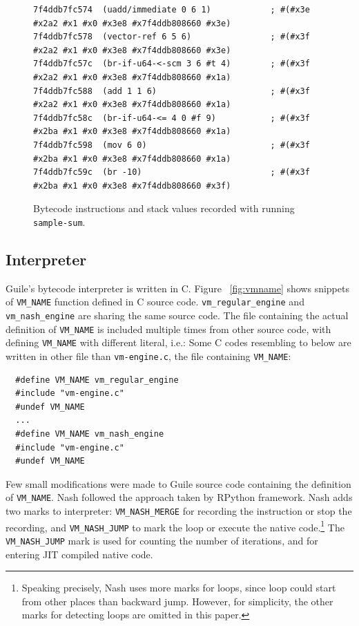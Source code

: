 \documentclass[preprint, numbers]{sigplanconf}
\begin{document}
\begin{figure}
  \centering
\begin{verbatim}
7f4ddb7fc574  (uadd/immediate 0 6 1)            ; #(#x3e #x2a2 #x1 #x0 #x3e8 #x7f4ddb808660 #x3e)
7f4ddb7fc578  (vector-ref 6 5 6)                ; #(#x3f #x2a2 #x1 #x0 #x3e8 #x7f4ddb808660 #x3e)
7f4ddb7fc57c  (br-if-u64-<-scm 3 6 #t 4)        ; #(#x3f #x2a2 #x1 #x0 #x3e8 #x7f4ddb808660 #x1a)
7f4ddb7fc588  (add 1 1 6)                       ; #(#x3f #x2a2 #x1 #x0 #x3e8 #x7f4ddb808660 #x1a)
7f4ddb7fc58c  (br-if-u64-<= 4 0 #f 9)           ; #(#x3f #x2ba #x1 #x0 #x3e8 #x7f4ddb808660 #x1a)
7f4ddb7fc598  (mov 6 0)                         ; #(#x3f #x2ba #x1 #x0 #x3e8 #x7f4ddb808660 #x1a)
7f4ddb7fc59c  (br -10)                          ; #(#x3f #x2ba #x1 #x0 #x3e8 #x7f4ddb808660 #x3f)
\end{verbatim}
\caption{Bytecode instructions and stack values recorded with running
  \texttt{sample-sum}.}
\label{fig:trace}
\end{figure}

\subsection{Interpreter}
Guile's bytecode interpreter is written in C. Figure~
\hyperref[fig:vmname]{\ref{fig:vmname}} shows snippets of \texttt{VM\_NAME}
function defined in C source code. \texttt{vm\_regular\_engine} and
\texttt{vm\_nash\_engine} are sharing the same source code. The file
containing the actual definition of \texttt{VM\_NAME} is included multiple
times from other source code, with defining \texttt{VM\_NAME} with different
literal, i.e.: Some C codes resembling to below are written in other file than
\texttt{vm-engine.c}, the file containing \texttt{VM\_NAME}:

\begin{verbatim}
  #define VM_NAME vm_regular_engine
  #include "vm-engine.c"
  #undef VM_NAME
  ...
  #define VM_NAME vm_nash_engine
  #include "vm-engine.c"
  #undef VM_NAME
\end{verbatim}

Few small modifications were made to Guile source code containing the
definition of \texttt{VM\_NAME}.  Nash followed the approach taken by
RPython\cite{bolz2009tracing} framework.  Nash adds two marks to interpreter:
\texttt{VM\_NASH\_MERGE} for recording the instruction or stop the recording,
and \texttt{VM\_NASH\_JUMP} to mark the loop or execute the native
code.\footnote{ Speaking precisely, Nash uses more marks for loops, since loop
  could start from other places than backward jump. However, for simplicity,
  the other marks for detecting loops are omitted in this paper.} The
\texttt{VM\_NASH\_JUMP} mark is used for counting the number of iterations,
and for entering JIT compiled native code.
\end{document}
